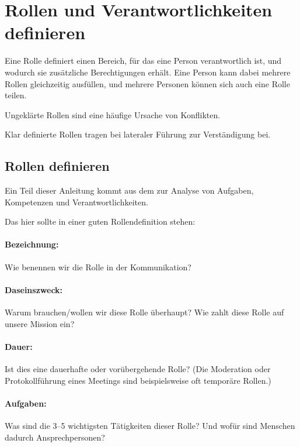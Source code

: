 \section{Rollen und Verantwortlichkeiten definieren}
\label{rollen}

Eine Rolle definiert einen Bereich, für das eine Person verantwortlich ist, und wodurch sie zusätzliche Berechtigungen erhält. Eine Person kann dabei mehrere Rollen gleichzeitig ausfüllen, und mehrere Personen können sich auch eine Rolle teilen.

Ungeklärte Rollen sind eine häufige Ursache von Konflikten.

Klar definierte Rollen tragen bei lateraler Führung zur Verständigung bei.


\subsection{Rollen definieren}

Ein Teil dieser Anleitung kommt aus dem  zur Analyse von Aufgaben, Kompetenzen und Verantwortlichkeiten.~\cite{kessler-projektmanagement}

Das hier sollte in einer guten Rollendefinition stehen:

\paragraph{Bezeichnung:} Wie benennen wir die Rolle in der Kommunikation?

\paragraph{Daseinszweck:} Warum brauchen/wollen wir diese Rolle überhaupt? Wie zahlt diese Rolle auf unsere Mission ein?

\paragraph{Dauer:} Ist dies eine dauerhafte oder vorübergehende Rolle? (Die Moderation oder Protokollführung eines Meetings sind beispielsweise oft temporäre Rollen.)

\paragraph{Aufgaben:} Was sind die 3--5 wichtigsten Tätigkeiten dieser Rolle? Und wofür sind Menschen dadurch Ansprechpersonen?

